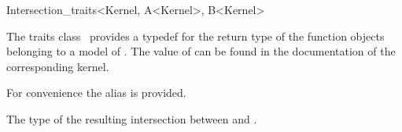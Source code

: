 \begin{ccRefClass}{Intersection_traits<Kernel, A<Kernel>, B<Kernel>}


\ccDefinition

The traits class \ccClassTemplateName\ provides a typedef for the
return type of the  function objects belonging to a
model of . The value of  can be found
in the  documentation of the corresponding kernel.

For convenience the alias  is provided.

\ccTypes

 The type of the resulting intersection between  and .
\end{ccRefClass}

